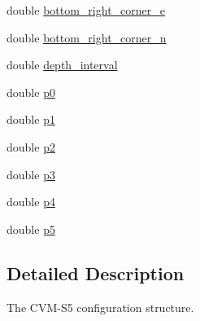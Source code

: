 \begin{DoxyCompactItemize}
\item 
double \hyperlink{structcvms5__configuration__t_a8a98866ca1082991503e8baecd1214d1}{bottom\+\_\+right\+\_\+corner\+\_\+e}
\item 
double \hyperlink{structcvms5__configuration__t_ab9a24ff06eff22e4c9c499eb0921ff3c}{bottom\+\_\+right\+\_\+corner\+\_\+n}
\item 
double \hyperlink{structcvms5__configuration__t_a6a1a8d114cc3bdc97db06078a7c648f5}{depth\+\_\+interval}
\item 
double \hyperlink{structcvms5__configuration__t_a97b754f5d51e0a8519edf02f7eed07d2}{p0}
\item 
double \hyperlink{structcvms5__configuration__t_a8bf5ffc779374ab9448d217d104b6182}{p1}
\item 
double \hyperlink{structcvms5__configuration__t_aa460736127fc2535673fc18800c6eb0c}{p2}
\item 
double \hyperlink{structcvms5__configuration__t_a03959cb46e3581897f31fff80159c67c}{p3}
\item 
double \hyperlink{structcvms5__configuration__t_a12aafb20aa62f080b7e2b89afc7d82fb}{p4}
\item 
double \hyperlink{structcvms5__configuration__t_a40e1c6f8058d9c00ebfb2b4986813acb}{p5}
\end{DoxyCompactItemize}


\subsection{Detailed Description}
The C\+V\+M-\/\+S5 configuration structure. 

